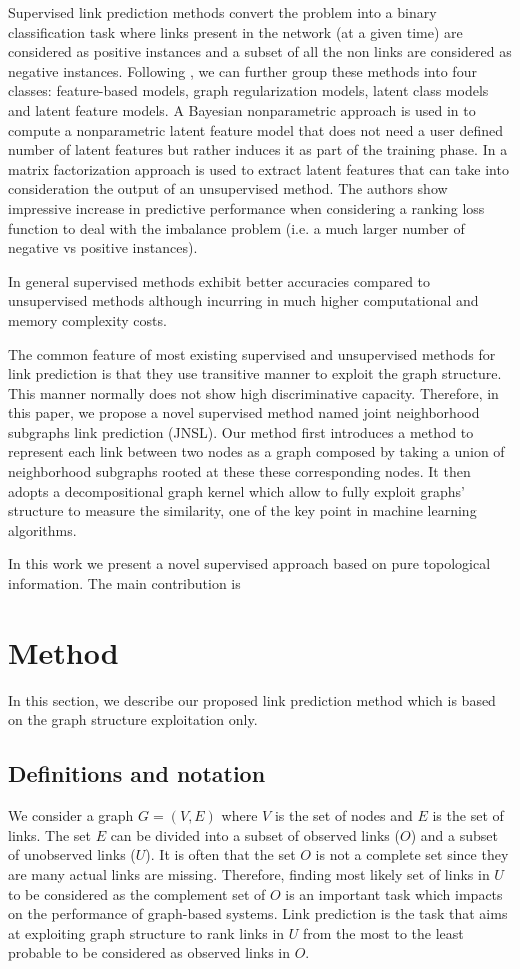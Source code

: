 \documentclass[runningheads,a4paper]{llncs}
\begin{document}
Supervised link prediction methods convert the problem into a binary classification task where links present in the network (at a given time) are considered as positive instances and a subset of all the non links are considered as negative instances. Following \cite{matrix-factorization}, we can further group these methods into four classes: feature-based models, graph regularization models, latent class models and latent feature models. 
A Bayesian nonparametric approach is used in \cite{nonparametric} to compute a nonparametric latent feature model that does not need a user defined number of latent features but rather induces it as part of the training phase. 
In \cite{matrix-factorization} a matrix factorization approach is used to extract latent features that can take into consideration the output of an unsupervised method. The authors show impressive increase in predictive performance when considering a ranking loss function to deal with the imbalance problem (i.e. a much larger number of negative vs positive instances). 

In general supervised methods exhibit better accuracies compared to unsupervised methods although incurring in much higher computational and memory complexity costs.


The common feature of most existing supervised and unsupervised methods for link prediction is that they use transitive manner to exploit the graph structure. This manner normally does not show high discriminative capacity. Therefore, in this paper, we propose a novel supervised method named joint neighborhood subgraphs link prediction (JNSL). Our method first introduces a method to represent each link between two nodes as a graph composed by taking a union of neighborhood subgraphs rooted at these these corresponding nodes. It then adopts a decompositional graph kernel which allow to fully exploit graphs' structure to measure the similarity, one of the key point in machine learning algorithms.

In this work we present a novel supervised approach based on pure topological information.
The main contribution is 

\section{Method}
In this section, we describe our proposed link prediction method which is based on the graph structure exploitation only.
\subsection{Definitions and notation}
We consider a graph $G=(V,E)$ where $V$ is the set of nodes and $E$ is the set of links. The set $E$ can be divided into a subset of observed links ($O$) and a subset of unobserved links ($U$). It is often that the set $O$ is not a complete set since they are many actual links are missing. Therefore, finding most likely set of links in $U$ to be considered as the complement set of $O$ is an important task which impacts on the performance of graph-based systems. Link prediction is the task that aims at exploiting graph structure to rank links in $U$ from the most to the least probable to be considered as observed links in $O$.
\end{document}
